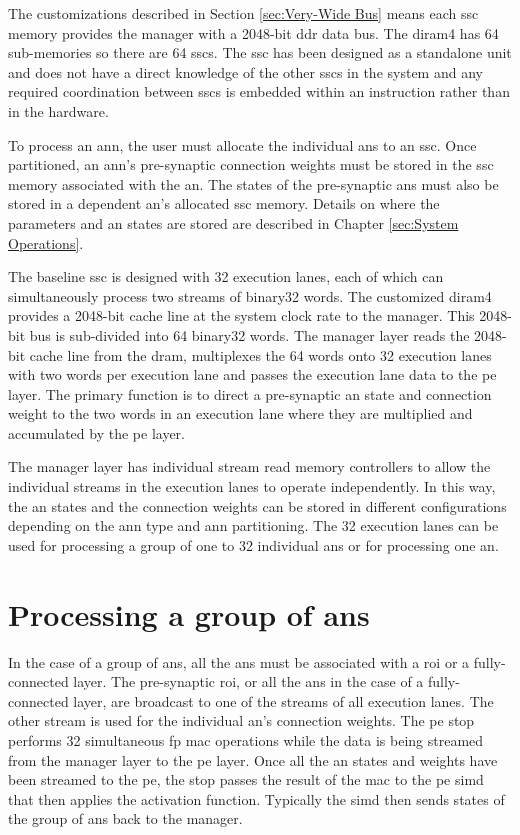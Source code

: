 The customizations described in Section \ref{sec:Very-Wide Bus} means each \ac{ssc} memory provides the manager with a 2048-bit \ac{ddr} data bus.
The \ac{diram4} has 64 sub-memories so there are 64 \acp{ssc}. 
The \ac{ssc} has been designed as a standalone unit and does not have a direct knowledge of the other \acp{ssc} in the system and any required coordination between \acp{ssc} is embedded within an instruction rather than in the hardware.

To process an \ac{ann}, the user must allocate the individual \acp{an} to an \ac{ssc}. 
Once partitioned, an \ac{ann}'s pre-synaptic connection weights must be stored in the \ac{ssc} memory associated with the \ac{an}.
The states of the pre-synaptic \acp{an} must also be stored in a dependent \ac{an}'s allocated \ac{ssc} memory.
Details on where the parameters and \ac{an} states are stored are described in Chapter \ref{sec:System Operations}.

The baseline \ac{ssc} is designed with 32 execution lanes, each of which can simultaneously process two streams of \ac{binary32} words.
The customized \ac{diram4} provides a 2048-bit cache line at the system clock rate to the manager. This 2048-bit bus is sub-divided into 64 \ac{binary32} words.
The manager layer reads the 2048-bit cache line from the \ac{dram}, multiplexes the 64 words onto 32 execution lanes with two words per execution lane and passes the execution lane data to the \ac{pe} layer.
The primary function is to direct a pre-synaptic \ac{an} state and connection weight to the two words in an execution lane where they are multiplied and accumulated by the \ac{pe} layer.

The manager layer has individual stream read memory controllers to allow the individual streams in the execution lanes to operate independently.
In this way, the \ac{an} states and the connection weights can be stored in different configurations depending on the \ac{ann} type and \ac{ann} partitioning.
The 32 execution lanes can be used for processing a group of one to 32 individual \acp{an} or for processing one \ac{an}.

\section{Processing a group of \acp{an}}
\label{sec:Processing a group of ANes}

In the case of a group of \acp{an}, all the \acp{an} must be associated with a \ac{roi} or a fully-connected layer.
The pre-synaptic \ac{roi}, or all the \acp{an} in the case of a fully-connected layer, are broadcast to one of the streams of all execution lanes.
The other stream is used for the individual \ac{an}'s connection weights. 
The \ac{pe} \ac{stop} performs 32 simultaneous \acf{fp} \ac{mac} operations while the data is being streamed from the manager layer to the \ac{pe} layer.
Once all the \ac{an} states and weights have been streamed to the \ac{pe}, the \ac{stop} passes the result of the \ac{mac} to the \ac{pe} \ac{simd} that then applies the activation function.
Typically the \ac{simd} then sends states of the group of \acp{an} back to the manager.

